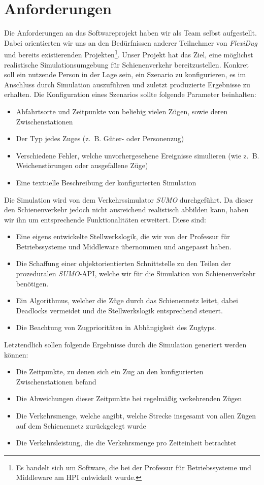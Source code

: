 \section{Anforderungen}
Die Anforderungen an das Softwareprojekt haben wir als Team selbst aufgestellt. Dabei orientierten wir uns an den Bedürfnissen anderer Teilnehmer von \emph{FlexiDug} und bereits existierenden Projekten\footnote{Es handelt sich um Software, die bei der Professur für Betriebssysteme und Middleware am HPI entwickelt wurde.}. Unser Projekt hat das Ziel, eine möglichst realistische Simulationsumgebung für Schienenverkehr bereitzustellen. Konkret soll ein nutzende Person in der Lage sein, ein Szenario zu konfigurieren, es im Anschluss durch Simulation auszuführen und zuletzt produzierte Ergebnisse zu erhalten. Die Konfiguration eines Szenarios sollte folgende Parameter beinhalten:
\begin{itemize}
    \item Abfahrtsorte und Zeitpunkte von beliebig vielen Zügen, sowie deren Zwischenstationen
    \item Der Typ jedes Zuges (z.~B. Güter- oder Personenzug)
    \item Verschiedene Fehler, welche unvorhergesehene Ereignisse simulieren (wie z.~B. Weichenstörungen oder ausgefallene Züge)
    \item Eine textuelle Beschreibung der konfigurierten Simulation
\end{itemize}
Die Simulation wird von dem Verkehrssimulator \emph{SUMO} \cite{noauthor_eclipse_nodate} durchgeführt. Da dieser den Schienenverkehr jedoch nicht ausreichend realistisch abbilden kann, haben wir ihn um entsprechende Funktionalitäten erweitert. Diese sind:
\begin{itemize}
    \item Eine eigens entwickelte Stellwerkslogik, die wir von der Professur für Betriebssysteme und Middleware übernommen und angepasst haben. \cite{noauthor_interlocking_2023}
    \item Die Schaffung einer objektorientierten Schnittstelle zu den Teilen der prozeduralen \emph{SUMO}-API, welche wir für die Simulation von Schienenverkehr benötigen.
    \item Ein Algorithmus, welcher die Züge durch das Schienennetz leitet, dabei Deadlocks vermeidet und die Stellwerkslogik entsprechend steuert.
    \item Die Beachtung von Zugprioritäten in Abhängigkeit des Zugtyps.
\end{itemize}
Letztendlich sollen folgende Ergebnisse durch die Simulation generiert werden können:
\begin{itemize}
    \item Die Zeitpunkte, zu denen sich ein Zug an den konfigurierten Zwischenstationen befand
    \item Die Abweichungen dieser Zeitpunkte bei regelmäßig verkehrenden Zügen
    \item Die Verkehrsmenge, welche angibt, welche Strecke insgesamt von allen Zügen auf dem Schienennetz zurückgelegt wurde
    \item Die Verkehrsleistung, die die Verkehrsmenge pro Zeiteinheit betrachtet
\end{itemize}

